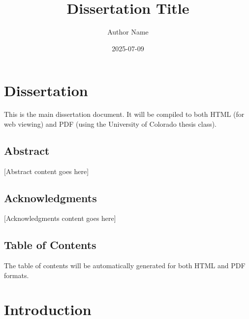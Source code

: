 \documentclass[
  12pt,
  letterpaper,
  12pt,
  letterpaper,
  oneside]{report}
\title{Dissertation Title}
\author{Author Name}
\date{2025-07-09}
\renewcommand*\contentsname{Table of contents}
\newcommand\contentsname{Table of contents}
\begin{document}
\maketitle

\renewcommand*\contentsname{Table of contents}
{
\hypersetup{linkcolor=}
\setcounter{tocdepth}{2}
\tableofcontents
}
\listoffigures
\listoftables


\chapter*{Dissertation}\label{dissertation}


This is the main dissertation document. It will be compiled to both HTML
(for web viewing) and PDF (using the University of Colorado thesis
class).

\section*{Abstract}\label{abstract}


{[}Abstract content goes here{]}

\section*{Acknowledgments}\label{acknowledgments}


{[}Acknowledgments content goes here{]}

\section*{Table of Contents}\label{table-of-contents}


The table of contents will be automatically generated for both HTML and
PDF formats.


\chapter{Introduction}\label{introduction}
\end{document}
